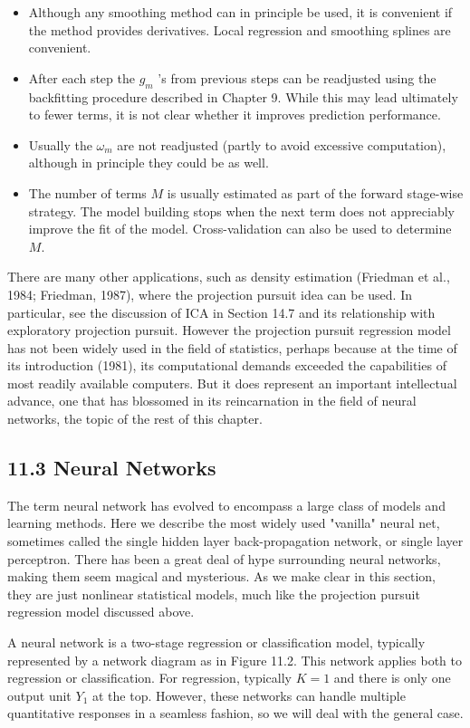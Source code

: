 \documentclass[10pt]{article}
\begin{document}
\begin{itemize}
  \item Although any smoothing method can in principle be used, it is convenient if the method provides derivatives. Local regression and smoothing splines are convenient.
  \item After each step the $g_{m}$ 's from previous steps can be readjusted using the backfitting procedure described in Chapter 9. While this may lead ultimately to fewer terms, it is not clear whether it improves prediction performance.
  \item Usually the $\omega_{m}$ are not readjusted (partly to avoid excessive computation), although in principle they could be as well.
  \item The number of terms $M$ is usually estimated as part of the forward stage-wise strategy. The model building stops when the next term does not appreciably improve the fit of the model. Cross-validation can also be used to determine $M$.
\end{itemize}

There are many other applications, such as density estimation (Friedman et al., 1984; Friedman, 1987), where the projection pursuit idea can be used. In particular, see the discussion of ICA in Section 14.7 and its relationship with exploratory projection pursuit. However the projection pursuit regression model has not been widely used in the field of statistics, perhaps because at the time of its introduction (1981), its computational demands exceeded the capabilities of most readily available computers. But it does represent an important intellectual advance, one that has blossomed in its reincarnation in the field of neural networks, the topic of the rest of this chapter.

\subsection*{11.3 Neural Networks}
The term neural network has evolved to encompass a large class of models and learning methods. Here we describe the most widely used "vanilla" neural net, sometimes called the single hidden layer back-propagation network, or single layer perceptron. There has been a great deal of hype surrounding neural networks, making them seem magical and mysterious. As we make clear in this section, they are just nonlinear statistical models, much like the projection pursuit regression model discussed above.

A neural network is a two-stage regression or classification model, typically represented by a network diagram as in Figure 11.2. This network applies both to regression or classification. For regression, typically $K=1$ and there is only one output unit $Y_{1}$ at the top. However, these networks can handle multiple quantitative responses in a seamless fashion, so we will deal with the general case.
\end{document}
